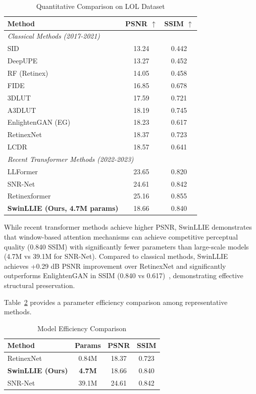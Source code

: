 \documentclass[conference]{IEEEtran}
\begin{document}
\begin{table}[htbp]
\caption{Quantitative Comparison on LOL Dataset}
\centering
\begin{tabular}{lcc}
\toprule
\textbf{Method} & \textbf{PSNR $\uparrow$} & \textbf{SSIM $\uparrow$} \\
\midrule
\multicolumn{3}{l}{\textit{Classical Methods (2017-2021)}} \\
SID & 13.24 & 0.442 \\
DeepUPE & 13.27 & 0.452 \\
RF (Retinex) & 14.05 & 0.458 \\
FIDE & 16.85 & 0.678 \\
3DLUT & 17.59 & 0.721 \\
A3DLUT & 18.19 & 0.745 \\
EnlightenGAN (EG) & 18.23 & 0.617 \\
RetinexNet & 18.37 & 0.723 \\
LCDR & 18.57 & 0.641 \\
\midrule
\multicolumn{3}{l}{\textit{Recent Transformer Methods (2022-2023)}} \\
LLFormer~\cite{wang2023llformer} & 23.65 & 0.820 \\
SNR-Net~\cite{xu2022snrnet} & 24.61 & 0.842 \\
Retinexformer~\cite{cai2023retinexformer} & 25.16 & 0.855 \\
\midrule
\textbf{SwinLLIE (Ours, 4.7M params)} & 18.66 & 0.840 \\
\bottomrule
\end{tabular}
\label{tab:results}
\end{table}

While recent transformer methods achieve higher PSNR, SwinLLIE demonstrates that window-based attention mechanisms can achieve competitive perceptual quality (0.840 SSIM) with significantly fewer parameters than large-scale models (4.7M vs 39.1M for SNR-Net). Compared to classical methods, SwinLLIE achieves +0.29 dB PSNR improvement over RetinexNet and significantly outperforms EnlightenGAN in SSIM (0.840 vs 0.617)~\cite{wang2004ssim}, demonstrating effective structural preservation.

Table~\ref{tab:efficiency} provides a parameter efficiency comparison among representative methods.

\begin{table}[htbp]
\caption{Model Efficiency Comparison}
\centering
\begin{tabular}{lccc}
\toprule
\textbf{Method} & \textbf{Params} & \textbf{PSNR} & \textbf{SSIM} \\
\midrule
RetinexNet & 0.84M & 18.37 & 0.723 \\
\textbf{SwinLLIE (Ours)} & \textbf{4.7M} & 18.66 & 0.840 \\
SNR-Net & 39.1M & 24.61 & 0.842 \\
\bottomrule
\end{tabular}
\label{tab:efficiency}
\end{table}
\end{document}
